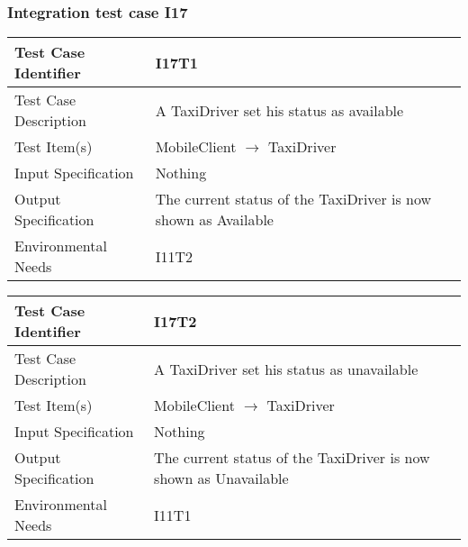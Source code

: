 		\subsubsection{Integration test case I17}
		\begin{center}
			\begin{tabular}{ |l p{10cm}| } \hline
				Test Case Identifier & I17T1 \\ \hline
				Test Case Description & A TaxiDriver set his status as available  \\ \hline
				Test Item(s) & MobileClient $\rightarrow$ TaxiDriver \\ \hline
				Input Specification & Nothing \\ \hline
				Output Specification & The current status of the TaxiDriver is now shown as Available \\ \hline
				Environmental Needs & I11T2 \\ \hline
			\end{tabular}
			\begin{tabular}{ |l p{10cm}| } \hline
				Test Case Identifier & I17T2 \\ \hline
				Test Case Description & A TaxiDriver set his status as unavailable  \\ \hline
				Test Item(s) & MobileClient $\rightarrow$ TaxiDriver \\ \hline
				Input Specification & Nothing \\ \hline
				Output Specification & The current status of the TaxiDriver is now shown as Unavailable \\ \hline
				Environmental Needs & I11T1 \\ \hline
			\end{tabular}
		\end{center}
